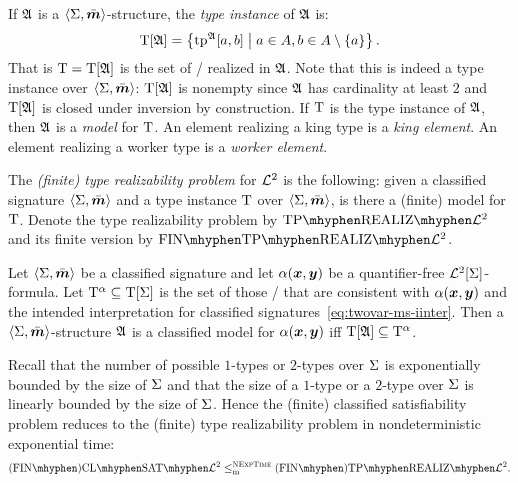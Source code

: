 If $\mathfrak{A}$ is a $\left\langle \mathrm{\Sigma},\bar{\bm{m}} \right\rangle$-structure, the \emph{type instance} of $\mathfrak{A}$
is:
\[
  \mathrm{T}[\mathfrak{A}] = \left\{\operatorname{tp}^{\mathfrak{A}}[a,b]\mathrel{}\middle|\mathrel{}
    a \in A, b \in A \setminus\left\{a\right\}\right\}.
\]
That is $\mathrm{T} = \mathrm{T}[\mathfrak{A}]$ is the set of \twotypes/ realized in $\mathfrak{A}$.
Note that this is indeed a type instance over $\left\langle \mathrm{\Sigma},\bar{\bm{m}} \right\rangle$:
$\mathrm{T}[\mathfrak{A}]$ is nonempty since $\mathfrak{A}$ has cardinality at least $2$
and $\mathrm{T}[\mathfrak{A}]$ is closed under inversion by construction.
If $\mathrm{T}$ is the type instance of $\mathfrak{A}$, then $\mathfrak{A}$ is a \emph{model} for
$\mathrm{T}$.
An element realizing a king type is a \emph{king element}.
An element realizing a worker type is a \emph{worker element}.

\begin{definition}
The \emph{(finite) type realizability problem} for $\mathcal{L}^{2}$ is the following:
given a classified signature $\left\langle \mathrm{\Sigma},\bar{\bm{m}} \right\rangle$ and a type instance $\mathrm{T}$ over
$\left\langle \mathrm{\Sigma},\bar{\bm{m}} \right\rangle$, is there a (finite) model for $\mathrm{T}$.
Denote the type realizability problem by $\Real{\vFo2}$ and its finite version
by $\FinReal{\vFo2}$.
\end{definition}

\begin{remark}\label{rem:red-sat-to-real}
Let $\left\langle \mathrm{\Sigma},\bar{\bm{m}} \right\rangle$ be a classified signature and let $\alpha(\bm{x},\bm{y})$ be a
quantifier-free $\mathcal{L}^{2}[\mathrm{\Sigma}]$-formula.
Let $\mathrm{T}^\alpha \subseteq \mathrm{T}[\mathrm{\Sigma}]$ is the set of those \twotypes/ that are
consistent with $\alpha(\bm{x},\bm{y})$ and the intended interpretation
for classified signatures~\cref{eq:twovar-ms-iinter}.
Then a $\left\langle \mathrm{\Sigma},\bar{\bm{m}} \right\rangle$-structure $\mathfrak{A}$ is a classified model for
$\alpha(\bm{x},\bm{y})$ iff $\mathrm{T}[\mathfrak{A}] \subseteq \mathrm{T}^\alpha$.

Recall that the number of possible $1$-types or $2$-types over $\mathrm{\Sigma}$ is
exponentially bounded by the size of $\mathrm{\Sigma}$ and that the size of a $1$-type or
a $2$-type over $\mathrm{\Sigma}$ is linearly bounded by the size of $\mathrm{\Sigma}$.
Hence the (finite) classified satisfiability problem reduces to the
(finite) type realizability problem in nondeterministic exponential time:
\[
  \FinAClSat{\vFo2} \red\cNExpTime \FinAReal{\vFo2}.
\]
\end{remark}

